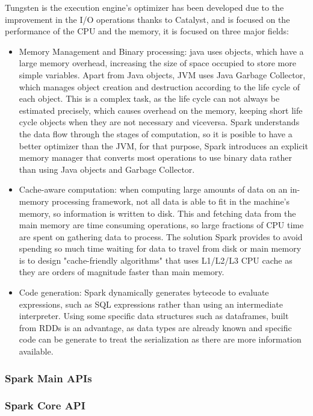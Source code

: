 \documentclass[11pt]{article} %
\begin{document}
        Tungsten is the execution engine's optimizer has been developed due to the improvement in the I/O operations thanks to Catalyst, and is focused on the performance of the CPU and the memory, it is focused on three major fields:

        \begin{itemize}
          \item Memory Management and Binary processing: java uses objects, which have a large memory overhead, increasing the size of space occupied to store more simple variables. Apart from Java objects, JVM uses Java Garbage Collector, which manages object creation and destruction according to the life cycle of each object. This is a complex task, as the life cycle can not always be estimated precisely, which causes overhead on the memory, keeping short life cycle objects when they are not necessary and viceversa. Spark understands the data flow through the stages of computation, so it is posible to have a better optimizer than the JVM, for that purpose, Spark introduces an explicit memory manager that converts most operations to use binary data rather than using Java objects and Garbage Collector.
          \item Cache-aware computation: when computing large amounts of data on an in-memory processing framework, not all data is able to fit in the machine's memory, so information is written to disk. This and fetching data from the main memory are time consuming operations, so large fractions of CPU time are spent on gathering data to process. The solution Spark provides to avoid spending so much time waiting for data to travel from disk or main memory is to design "cache-friendly algorithms" that uses L1/L2/L3 CPU cache as they are orders of magnitude faster than main memory.
          \item Code generation: Spark dynamically generates bytecode to evaluate expressions, such as SQL expressions rather than using an intermediate interpreter. Using some specific data structures such as dataframes, built from RDDs is an advantage, as data types are already known and specific code can be generate to treat the serialization as there are more information available.
        \end{itemize}


      \subsubsection{Spark Main APIs}

        \subsubsection*{Spark Core API}
\end{document}
